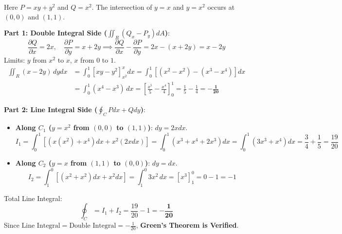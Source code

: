 \begin{solutionbox}
Here $P = xy + y^2$ and $Q = x^2$. The intersection of $y = x$ and $y = x^2$ occurs at $(0,0)$ and $(1,1)$.

\textbf{Part 1: Double Integral Side ($\iint_R (Q_x - P_y)dA$)}:
\begin{equation*}
    \frac{\partial Q}{\partial x} = 2x, \quad \frac{\partial P}{\partial y} = x + 2y \implies \frac{\partial Q}{\partial x} - \frac{\partial P}{\partial y} = 2x - (x+2y) = x - 2y
\end{equation*}
Limits: $y$ from $x^2$ to $x$, $x$ from $0$ to $1$.
\begin{align*}
    \iint_R (x - 2y)\,dy dx &= \int_0^1 \left[ xy - y^2 \right]_{x^2}^x dx = \int_0^1 \left[ (x^2 - x^2) - (x^3 - x^4) \right] dx \\
    &= \int_0^1 (x^4 - x^3)\,dx = \left[ \frac{x^5}{5} - \frac{x^4}{4} \right]_0^1 = \frac{1}{5} - \frac{1}{4} = \mathbf{-\frac{1}{20}}
\end{align*}

\textbf{Part 2: Line Integral Side ($\oint_C P dx + Q dy$)}:
\begin{itemize}
    \item \textbf{Along $C_1$ ($y = x^2$ from $(0,0)$ to $(1,1)$)}: $dy = 2x dx$.
    \begin{equation*}
        I_1 = \int_0^1 [(x(x^2) + x^4)dx + x^2(2x dx)] = \int_0^1 (x^3 + x^4 + 2x^3)dx = \int_0^1 (3x^3 + x^4)dx = \frac{3}{4} + \frac{1}{5} = \frac{19}{20}
    \end{equation*}
    \item \textbf{Along $C_2$ ($y = x$ from $(1,1)$ to $(0,0)$)}: $dy = dx$.
    \begin{equation*}
        I_2 = \int_1^0 [(x^2 + x^2)dx + x^2 dx] = \int_1^0 3x^2\,dx = [x^3]_1^0 = 0 - 1 = -1
    \end{equation*}
\end{itemize}
Total Line Integral:
\begin{equation*}
    \oint_C = I_1 + I_2 = \frac{19}{20} - 1 = \mathbf{-\frac{1}{20}}
\end{equation*}
Since $\text{Line Integral} = \text{Double Integral} = -\frac{1}{20}$, \textbf{Green's Theorem is Verified}.
\end{solutionbox}

